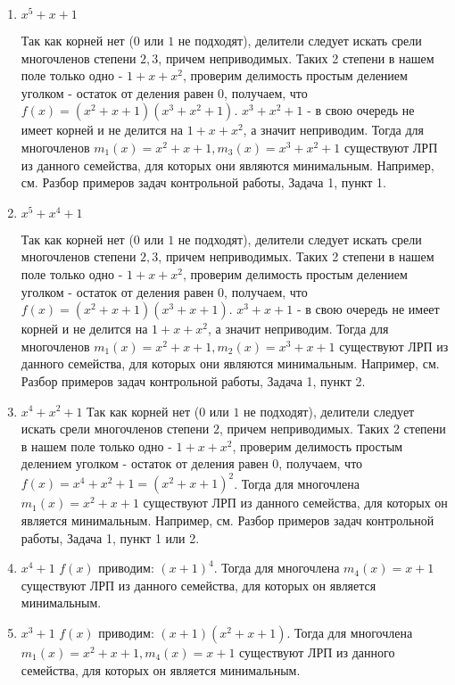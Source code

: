 \documentclass[12pt]{extarticle}
\begin{document}
\begin{enumerate}
    \item $x^5+x+1$
    
     Так как корней нет ($0$ или $1$ не подходят), делители следует искать срели многочленов степени $2,3$, причем неприводимых. Таких 2 степени в нашем поле только одно - $1 + x + x^2$, проверим делимость простым делением уголком - остаток от деления равен $0$, получаем, что $f(x) = (x^2+x+1)(x^3+x^2+1)$. $x^3+x^2+1$ - в свою очередь не имеет корней и не делится на $1 + x + x^2$, а значит неприводим. Тогда для многочленов $m_1(x)=x^2+x+1, m_3(x) = x^3+x^2+1$ существуют ЛРП из данного семейства, для которых они  являются минимальным. Например, см. Разбор примеров задач контрольной работы, Задача 1, пункт 1.
     
     \item $x^5+x^4+1$
     
     Так как корней нет ($0$ или $1$ не подходят), делители следует искать срели многочленов степени $2,3$, причем неприводимых. Таких 2 степени в нашем поле только одно - $1 + x + x^2$, проверим делимость простым делением уголком - остаток от деления равен $0$, получаем, что $f(x) = (x^2+x+1)(x^3+x+1)$. $x^3+x+1$ - в свою очередь не имеет корней и не делится на $1 + x + x^2$, а значит неприводим. Тогда для многочленов $m_1(x)=x^2+x+1, m_2(x)=x^3+x+1$ существуют ЛРП из данного семейства, для которых они  являются минимальным.  Например, см. Разбор примеров задач контрольной работы, Задача 1, пункт 2.
     
     \item $x^4+x^2+1$
     Так как корней нет ($0$ или $1$ не подходят), делители следует искать срели многочленов степени $2$, причем неприводимых. Таких 2 степени в нашем поле только одно - $1 + x + x^2$, проверим делимость простым делением уголком - остаток от деления равен $0$, получаем, что $f(x) = x^4+x^2+1 = (x^2+x+1)^2$. Тогда для многочлена $m_1(x)=x^2+x+1$ существуют ЛРП из данного семейства, для которых он  является минимальным.  Например, см. Разбор примеров задач контрольной работы, Задача 1, пункт 1 или 2.
     
     \item $x^4+1$
     $f(x)$ приводим: $(x+1)^4$. Тогда для многочлена $m_4(x)=x+1$ существуют ЛРП из данного семейства, для которых он  является минимальным. 
     
     \item $x^3+1$
     $f(x)$ приводим: $(x+1)(x^2+x+1)$. Тогда для многочлена $m_1(x)=x^2+x+1, m_4(x)=x+1$ существуют ЛРП из данного семейства, для которых он  является минимальным. 
     
\end{enumerate}
\end{document}

